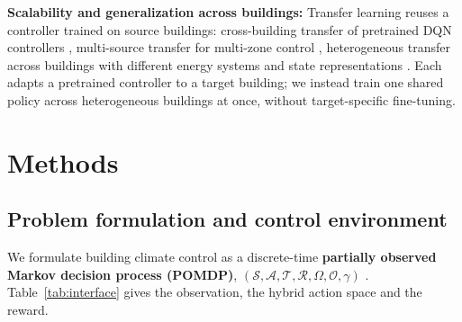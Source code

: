 \documentclass{article}
\begin{document}
\textbf{Scalability and generalization across buildings:} Transfer learning reuses a controller trained on source buildings: cross-building transfer of pretrained DQN controllers \citep{fang2023cross}, multi-source transfer for multi-zone control \citep{hou2024multi}, heterogeneous transfer across buildings with different energy systems and state representations \citep{coraci2024heterogeneous}. Each adapts a pretrained controller to a target building; we instead train one shared policy across heterogeneous buildings at once, without target-specific fine-tuning.

\section{Methods}

\subsection{Problem formulation and control environment}

We formulate building climate control as a discrete-time \textbf{partially observed Markov decision process (POMDP)}, $(\mathcal{S}, \mathcal{A}, \mathcal{T}, \mathcal{R}, \Omega, \mathcal{O}, \gamma)$ \citep{garcia2013mdp,sutton2018reinforcement}. Table~\ref{tab:interface} gives the observation, the hybrid action space and the reward.
\end{document}
